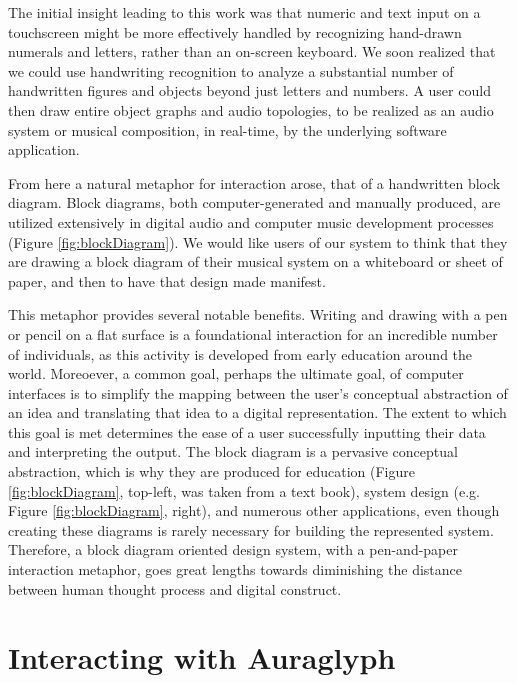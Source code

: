 \documentclass{nime-alternate}
\begin{document}
The initial insight leading to this work was that numeric and text input on a touchscreen might be more effectively handled by recognizing hand-drawn numerals and letters, rather than an on-screen keyboard. 
We soon realized that we could use handwriting recognition to analyze a substantial number of handwritten figures and objects beyond just letters and numbers. 
A user could then draw entire object graphs and audio topologies, to be realized as an audio system or musical composition, in real-time, by the underlying software application. 

From here a natural metaphor for interaction arose, that of a handwritten block diagram.
Block diagrams, both computer-generated and manually produced, are utilized extensively in digital audio and computer music development processes (Figure \ref{fig:blockDiagram}). 
We would like users of our system to think that they are drawing a block diagram of their musical system on a whiteboard or sheet of paper, and then to have that design made manifest. 

This metaphor provides several notable benefits. 
Writing and drawing with a pen or pencil on a flat surface is a foundational interaction for an incredible number of individuals, as this activity is developed from early education around the world. 
Moreoever, a common goal, perhaps the ultimate goal, of computer interfaces is to simplify the mapping between the user's conceptual abstraction of an idea and translating that idea to a digital representation. 
The extent to which this goal is met determines the ease of a user successfully inputting their data and interpreting the output. 
The block diagram is a pervasive conceptual abstraction, which is why they are produced for education (Figure \ref{fig:blockDiagram}, top-left, was taken from a text book), system design (e.g. Figure \ref{fig:blockDiagram}, right), and numerous other applications, even though creating these diagrams is rarely necessary for building the represented system. 
Therefore, a block diagram oriented design system, with a pen-and-paper interaction metaphor, goes great lengths towards diminishing the distance between human thought process and digital construct. 


\section{Interacting with Auraglyph}
\label{sec:SystemDescription}
\end{document}
